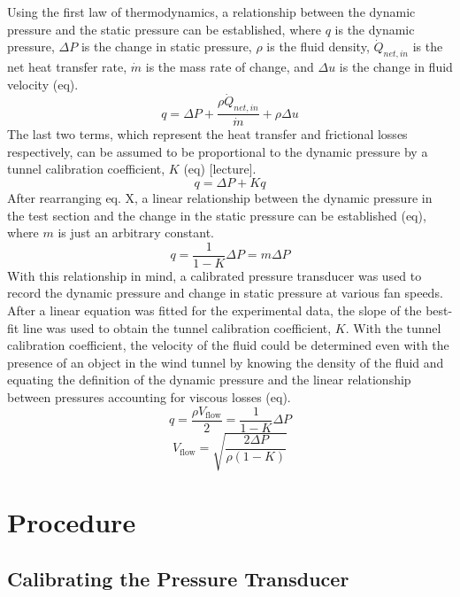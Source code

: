 \documentclass[journal,letterpaper]{IEEEtran}
\begin{document}
Using the first law of thermodynamics, a relationship between the dynamic pressure and the static pressure can be established, where $q$ is the dynamic pressure, $\Delta P$ is the change in static pressure, $\rho$ is the fluid density, $\dot{Q}_{net,in}$ is the net heat transfer rate, $\dot{m}$ is the mass rate of change, and $\Delta u$ is the change in fluid velocity (eq).
\begin{equation} \label{eq:firstLaw}
    q = \Delta P + \frac{\rho \dot{Q}_{net,in}}{\dot{m}} + \rho\Delta u
\end{equation}
The last two terms, which represent the heat transfer and frictional losses respectively, can be assumed to be proportional to the dynamic pressure by a tunnel calibration coefficient, $K$ (eq) [lecture].
\begin{equation} \label{eq:calCoeff}
    q = \Delta P + Kq
\end{equation}
After rearranging eq. X, a linear relationship between the dynamic pressure in the test section and the change in the static pressure can be established (eq), where $m$ is just an arbitrary constant.
\begin{equation} \label{eq:stat2dynP}
    q = \frac{1}{1 - K}\Delta P = m\Delta P
\end{equation}
With this relationship in mind, a calibrated pressure transducer was used to record the dynamic pressure and change in static pressure at various fan speeds.
After a linear equation was fitted for the experimental data, the slope of the best-fit line was used to obtain the tunnel calibration coefficient, $K$.
With the tunnel calibration coefficient, the velocity of the fluid could be determined even with the presence of an object in the wind tunnel by knowing the density of the fluid and equating the definition of the dynamic pressure and the linear relationship between pressures accounting for viscous losses (eq).
\begin{equation} \label{eq:dynDef}
    q = \frac{\rho V_\text{flow}}{2} = \frac{1}{1 - K}\Delta P
\end{equation}
\begin{equation} \label{eq:vflow}
    V_\text{flow} = \sqrt{\frac{2\Delta P}{\rho(1 - K)}}
\end{equation}

\section{Procedure}

\subsection{Calibrating the Pressure Transducer}
\end{document}
